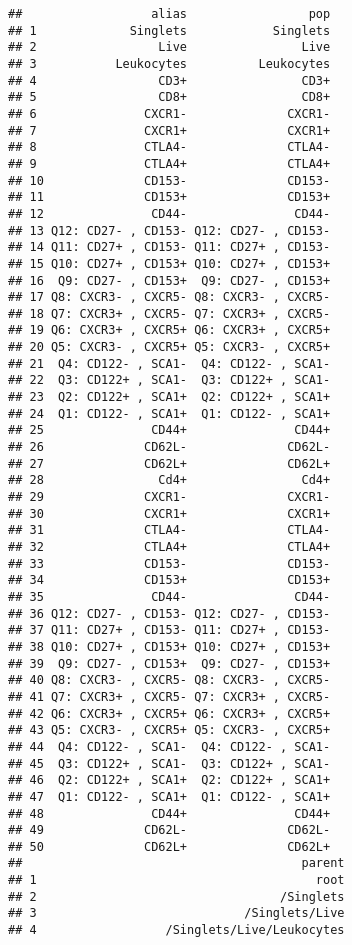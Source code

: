 \documentclass[]{book}
\begin{document}
\begin{verbatim}
##                  alias                 pop
## 1             Singlets            Singlets
## 2                 Live                Live
## 3           Leukocytes          Leukocytes
## 4                 CD3+                CD3+
## 5                 CD8+                CD8+
## 6               CXCR1-              CXCR1-
## 7               CXCR1+              CXCR1+
## 8               CTLA4-              CTLA4-
## 9               CTLA4+              CTLA4+
## 10              CD153-              CD153-
## 11              CD153+              CD153+
## 12               CD44-               CD44-
## 13 Q12: CD27- , CD153- Q12: CD27- , CD153-
## 14 Q11: CD27+ , CD153- Q11: CD27+ , CD153-
## 15 Q10: CD27+ , CD153+ Q10: CD27+ , CD153+
## 16  Q9: CD27- , CD153+  Q9: CD27- , CD153+
## 17 Q8: CXCR3- , CXCR5- Q8: CXCR3- , CXCR5-
## 18 Q7: CXCR3+ , CXCR5- Q7: CXCR3+ , CXCR5-
## 19 Q6: CXCR3+ , CXCR5+ Q6: CXCR3+ , CXCR5+
## 20 Q5: CXCR3- , CXCR5+ Q5: CXCR3- , CXCR5+
## 21  Q4: CD122- , SCA1-  Q4: CD122- , SCA1-
## 22  Q3: CD122+ , SCA1-  Q3: CD122+ , SCA1-
## 23  Q2: CD122+ , SCA1+  Q2: CD122+ , SCA1+
## 24  Q1: CD122- , SCA1+  Q1: CD122- , SCA1+
## 25               CD44+               CD44+
## 26              CD62L-              CD62L-
## 27              CD62L+              CD62L+
## 28                Cd4+                Cd4+
## 29              CXCR1-              CXCR1-
## 30              CXCR1+              CXCR1+
## 31              CTLA4-              CTLA4-
## 32              CTLA4+              CTLA4+
## 33              CD153-              CD153-
## 34              CD153+              CD153+
## 35               CD44-               CD44-
## 36 Q12: CD27- , CD153- Q12: CD27- , CD153-
## 37 Q11: CD27+ , CD153- Q11: CD27+ , CD153-
## 38 Q10: CD27+ , CD153+ Q10: CD27+ , CD153+
## 39  Q9: CD27- , CD153+  Q9: CD27- , CD153+
## 40 Q8: CXCR3- , CXCR5- Q8: CXCR3- , CXCR5-
## 41 Q7: CXCR3+ , CXCR5- Q7: CXCR3+ , CXCR5-
## 42 Q6: CXCR3+ , CXCR5+ Q6: CXCR3+ , CXCR5+
## 43 Q5: CXCR3- , CXCR5+ Q5: CXCR3- , CXCR5+
## 44  Q4: CD122- , SCA1-  Q4: CD122- , SCA1-
## 45  Q3: CD122+ , SCA1-  Q3: CD122+ , SCA1-
## 46  Q2: CD122+ , SCA1+  Q2: CD122+ , SCA1+
## 47  Q1: CD122- , SCA1+  Q1: CD122- , SCA1+
## 48               CD44+               CD44+
## 49              CD62L-              CD62L-
## 50              CD62L+              CD62L+
##                                       parent
## 1                                       root
## 2                                  /Singlets
## 3                             /Singlets/Live
## 4                  /Singlets/Live/Leukocytes

\end{verbatim}
\end{document}
